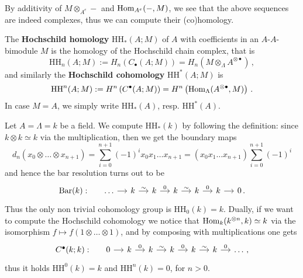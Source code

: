 	By additivity of $M \otimes_{A^{e}} -$ and $\operatorname{Hom}_{A^{e}}(-,M)$,
	we see that the above sequences are indeed complexes, 
	thus we can compute their (co)homology.
	
	\begin{df}
		The \textbf{Hochschild homology} $\mathrm{HH}_{*}(A;M)$ of $A$
		with coefficients in an $A$-$A$-bimodule $M$ is the
		homology of the Hochschild chain complex, that is
		\begin{equation*}
			\mathrm{HH}_{n}(A;M) := H_{n}\left(C_{\bullet}(A;M) \right) 
			= H_{n}\left(M \otimes_{\Lambda} A^{\otimes \bullet} \right)\,,
		\end{equation*}
		and similarly the \textbf{Hochschild cohomology} $\mathrm{HH}^*(A;M)$
		is %
		\begin{equation*}
			\mathrm{HH}^{n}(A;M) := H^{n}\left(C^{\bullet}(A;M) \right)
			= H^{n}\left(\operatorname{Hom}_{\Lambda}(A^{\otimes \bullet},M) \right)\,.
		\end{equation*}
		In case $M=A$, we simply write $\mathrm{HH}_{*}(A)$, resp. $\mathrm{HH}^{*}(A)$.
	\end{df}
	
	\begin{ex}
		Let $A = \Lambda = k$ be a field. 
		We compute $\mathrm{HH}_{*}(k)$
		by following the definition: since $k \otimes k \simeq k$ via the multiplication,
		then we get the boundary maps
		\begin{equation*}
			d_{n}(x_{0} \otimes \dots \otimes x_{n+1}) 
			= \sum_{i=0}^{n+1}(-1)^{i}x_{0}x_{1} \dots x_{n+1}
			= (x_{0}x_{1} \dots x_{n+1}) \sum_{i=0}^{n+1}(-1)^{i}
		\end{equation*}
		and hence the bar resolution turns out to be
		\begin{equation*}
			\begin{tikzcd}[column sep=small]
				\mathrm{Bar}(k):
				& \dots \ar[r]
				& k \ar[r, "\sim"]				
				& k \ar[r, "0"] 
				& k \ar[r, "\sim"]
				& k \ar[r, "0"]
				& k \ar[r]
				& 0\,.
			\end{tikzcd}
		\end{equation*}
		Thus the only non trivial cohomology group is $\mathrm{HH}_{0}(k) = k$.
		Dually, if we want to compute the Hochschild cohomology
		we notice that $\operatorname{Hom}_{k}(k^{\otimes n},k) \simeq k$ via the isomorphism
		$f \mapsto f(1 \otimes \dots \otimes 1)$, and by composing with multiplications
		one gets
		\begin{equation*}
			\begin{tikzcd}[column sep=small]
				C^{\bullet}(k;k):
				& 0 \ar[r]
				& k \ar[r, "0"]
				& k \ar[r, "\sim"]				
				& k \ar[r, "0"] 
				& k \ar[r, "\sim"]
				& k \ar[r, "0"]
				& \dots\,,
			\end{tikzcd}
		\end{equation*}
		thus it holds $\mathrm{HH}^{0}(k) = k$ and $\mathrm{HH}^{n}(k) = 0$, for $n>0$.
	\end{ex}
	

